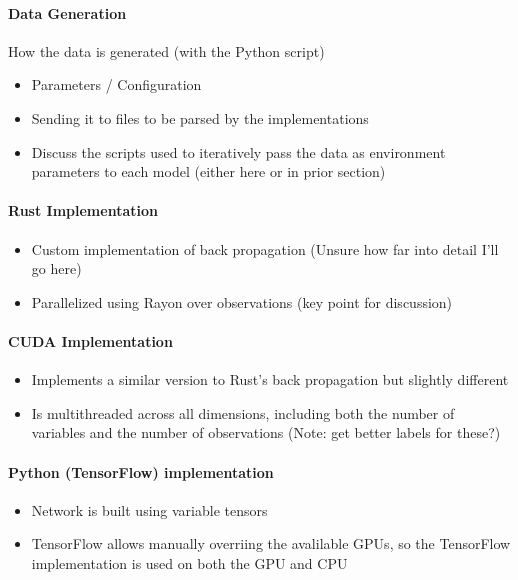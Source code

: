 \documentclass[12pt]{article}
\begin{document}
\paragraph{Data Generation}

How the data is generated (with the Python script)
\begin{itemize}
	\item Parameters / Configuration
	\item Sending it to files to be parsed by the implementations
	\item Discuss the scripts used to iteratively pass the data as environment parameters to each model (either here or in prior section)
\end{itemize}

\paragraph{Rust Implementation}

\begin{itemize}
	\item Custom implementation of back propagation (Unsure how far into detail I'll go here)
	\item Parallelized using Rayon \cite{lib_rayon} over observations (key point for discussion)
\end{itemize}

\paragraph{CUDA Implementation}


\begin{itemize}
	\item Implements a similar version to Rust's back propagation but slightly different
	\item Is multithreaded across all dimensions, including both the number of variables and the number of observations (Note: get better labels for these?)
\end{itemize}

\paragraph{Python (TensorFlow) implementation}

\begin{itemize}
	\item Network is built using variable tensors
	\item TensorFlow allows manually overriing the avalilable GPUs, so the TensorFlow implementation is used on both the GPU and CPU
\end{itemize}
\end{document}
